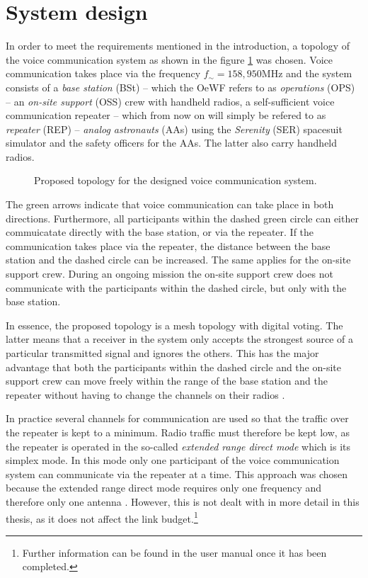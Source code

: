 \section{System design} \label{sec:system_design}
In order to meet the requirements mentioned in the introduction, a topology of the voice communication system as shown in the figure \ref{fig:tikz_system_topology} was chosen. Voice communication takes place via the frequency $f_\sim = 158,950\mathrm{MHz}$ and the system consists of a \emph{base station} (BSt) -- which the OeWF refers to as \emph{operations} (OPS) -- an \emph{on-site support} (OSS) crew with handheld radios, a self-sufficient voice communication repeater -- which from now on will simply be refered to as \emph{repeater} (REP) -- \emph{analog astronauts} (AAs) using the \emph{Serenity} (SER) spacesuit simulator and the safety officers for the AAs. The latter also carry handheld radios.
\begin{figure}[h!]
	\centering
	
	\caption{Proposed topology for the designed voice communication system.}
	\label{fig:tikz_system_topology}
\end{figure}
The green arrows indicate that voice communication can take place in both directions. Furthermore, all participants within the dashed green circle can either commuicatate directly with the base station, or via the repeater. If the communication takes place via the repeater, the distance between the base station and the dashed circle can be increased. The same applies for the on-site support crew. During an ongoing mission the on-site support crew does not communicate with the participants within the dashed circle, but only with the base station. 

In essence, the proposed topology is a mesh topology with digital voting. The latter means that a receiver in the system only accepts the strongest source of a particular transmitted signal and ignores the others. This has the major advantage that both the participants within the dashed circle and the on-site support crew can move freely within the range of the base station and the repeater without having to change the channels on their radios \cite{Parsons:2000, SystemPlanner:2018}.

In practice several channels for communication are used so that the traffic over the repeater is kept to a minimum. Radio traffic must therefore be kept low, as the repeater is operated in the so-called \emph{extended range direct mode} which is its simplex mode. In this mode only one participant of the voice communication system can communicate via the repeater at a time. This approach was chosen because the extended range direct mode requires only one frequency and therefore only one antenna \cite{SystemPlanner:2018}. However, this is not dealt with in more detail in this thesis, as it does not affect the link budget.\footnote{Further information can be found in the user manual once it has been completed.} 

